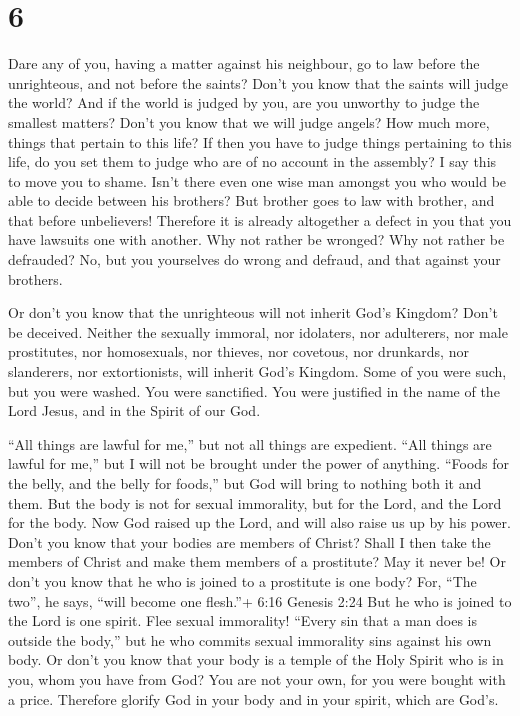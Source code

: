 \hypertarget{section-5}{%
\section{6}\label{section-5}}

 Dare any of you, having a matter against his neighbour, go
to law before the unrighteous, and not before the saints? 
Don't you know that the saints will judge the world? And if the world is
judged by you, are you unworthy to judge the smallest matters?
 Don't you know that we will judge angels? How much more,
things that pertain to this life?  If then you have to judge
things pertaining to this life, do you set them to judge who are of no
account in the assembly?  I say this to move you to shame.
Isn't there even one wise man amongst you who would be able to decide
between his brothers?  But brother goes to law with brother,
and that before unbelievers!  Therefore it is already
altogether a defect in you that you have lawsuits one with another. Why
not rather be wronged? Why not rather be defrauded?  No, but
you yourselves do wrong and defraud, and that against your brothers.

 Or don't you know that the unrighteous will not inherit
God's Kingdom? Don't be deceived. Neither the sexually immoral, nor
idolaters, nor adulterers, nor male prostitutes, nor homosexuals,
 nor thieves, nor covetous, nor drunkards, nor slanderers,
nor extortionists, will inherit God's Kingdom.  Some of you
were such, but you were washed. You were sanctified. You were justified
in the name of the Lord Jesus, and in the Spirit of our God.

 ``All things are lawful for me,'' but not all things are
expedient. ``All things are lawful for me,'' but I will not be brought
under the power of anything.  ``Foods for the belly, and
the belly for foods,'' but God will bring to nothing both it and them.
But the body is not for sexual immorality, but for the Lord, and the
Lord for the body.  Now God raised up the Lord, and will
also raise us up by his power.  Don't you know that your
bodies are members of Christ? Shall I then take the members of Christ
and make them members of a prostitute? May it never be!  Or
don't you know that he who is joined to a prostitute is one body? For,
``The two'', he says, ``will become one flesh.''+ 6:16 Genesis 2:24
 But he who is joined to the Lord is one spirit.
 Flee sexual immorality! ``Every sin that a man does is
outside the body,'' but he who commits sexual immorality sins against
his own body.  Or don't you know that your body is a temple
of the Holy Spirit who is in you, whom you have from God? You are not
your own,  for you were bought with a price. Therefore
glorify God in your body and in your spirit, which are God's.

